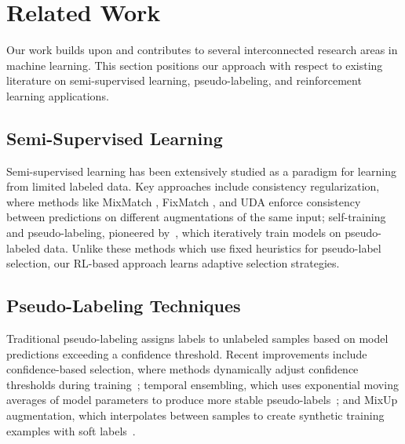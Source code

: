 \documentclass{scrartcl}
\begin{document}
\section{Related Work}
Our work builds upon and contributes to several interconnected research areas in machine learning. This section positions our approach with respect to existing literature on semi-supervised learning, pseudo-labeling, and reinforcement learning applications.

\subsection{Semi-Supervised Learning}
Semi-supervised learning has been extensively studied \cite{chapelle2006semi, zhu2005survey} as a paradigm for learning from limited labeled data. Key approaches include consistency regularization, where methods like MixMatch \cite{berthelot2019mixmatch}, FixMatch \cite{sohn2020fixmatch}, and UDA \cite{xie2020uda} enforce consistency between predictions on different augmentations of the same input; self-training and pseudo-labeling, pioneered by~\cite{yarowsky1995, scudder1965}, which iteratively train models on pseudo-labeled data. Unlike these methods which use fixed heuristics for pseudo-label selection, our RL-based approach learns adaptive selection strategies.

\subsection{Pseudo-Labeling Techniques}
Traditional pseudo-labeling assigns labels to unlabeled samples based on model predictions exceeding a confidence threshold. Recent improvements include confidence-based selection, where methods dynamically adjust confidence thresholds during training~\cite{sohn2020fixmatch}; temporal ensembling, which uses exponential moving averages of model parameters to produce more stable pseudo-labels~\cite{tarvainen2017mean}; and MixUp augmentation, which interpolates between samples to create synthetic training examples with soft labels~\cite{zhang2018mixup}.
\end{document}
